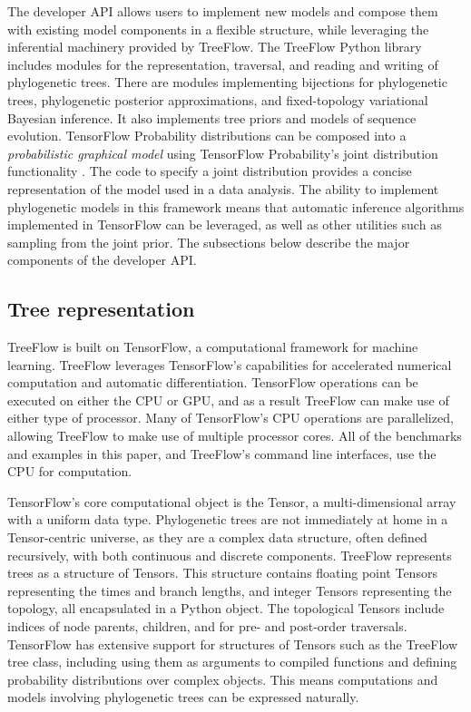 \documentclass{article}
\begin{document}
The developer API allows users to implement new models and compose them with existing model components in a flexible structure, while leveraging the inferential machinery provided by TreeFlow. The TreeFlow Python library includes modules for the representation, traversal, and reading and writing of phylogenetic trees. There are modules implementing bijections for phylogenetic trees, phylogenetic posterior approximations, and fixed-topology variational Bayesian inference. It also implements tree priors and models of sequence evolution. TensorFlow Probability distributions can be composed into a \textit{probabilistic graphical model} using TensorFlow Probability's joint distribution functionality \cite{piponi2020joint}. The code to specify a joint distribution provides a concise representation of the model used in a data analysis. The ability to implement phylogenetic models in this framework means that automatic inference algorithms implemented in TensorFlow can be leveraged, as well as other utilities such as sampling from the joint prior. The subsections below describe the major components of the developer API.

\subsection{Tree representation}

TreeFlow is built on TensorFlow, a computational framework for machine learning. TreeFlow leverages TensorFlow's capabilities for accelerated numerical computation and automatic differentiation. TensorFlow operations can be executed on either the CPU or GPU, and as a result TreeFlow can make use of either type of processor. Many of TensorFlow's CPU operations are parallelized, allowing TreeFlow to make use of multiple processor cores. All of the benchmarks and examples in this paper, and TreeFlow's command line interfaces, use the CPU for computation.

TensorFlow's core computational object is the Tensor, a multi-dimensional array with a uniform data type. Phylogenetic trees are not immediately at home in a Tensor-centric universe, as they are a complex data structure, often defined recursively, with both continuous and discrete components. TreeFlow represents trees as a structure of Tensors. This structure contains floating point Tensors representing the times and branch lengths, and integer Tensors representing the topology, all encapsulated in a Python object. The topological Tensors include indices of node parents, children, and for pre- and post-order traversals. TensorFlow has extensive support for structures of Tensors such as the TreeFlow tree class, including using them as arguments to compiled functions and defining probability distributions over complex objects. This means computations and models involving phylogenetic trees can be expressed naturally.
\end{document}
